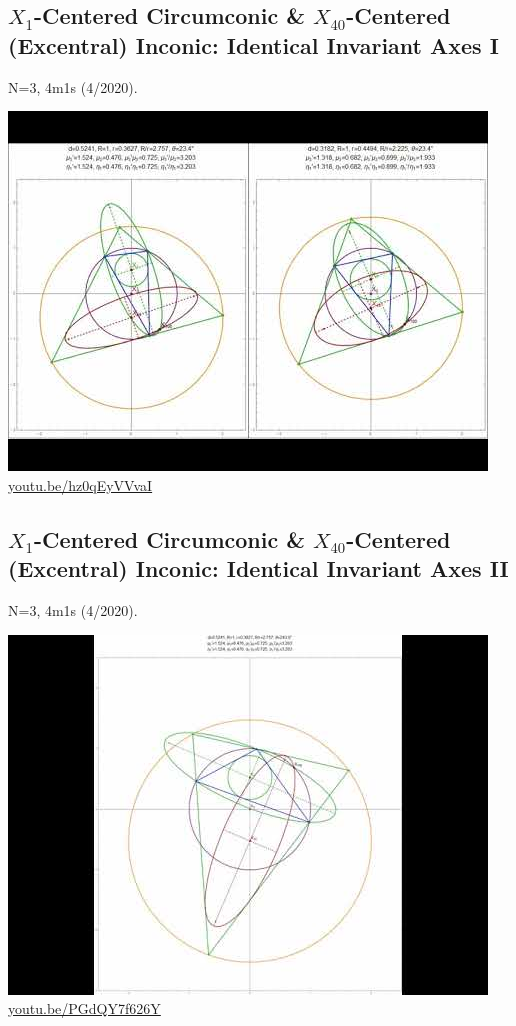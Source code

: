 \documentclass[12pt]{amsart}
\begin{document}
\subsection{$X_{1}$-Centered Circumconic \& $X_{40}$-Centered (Excentral) Inconic: Identical Invariant Axes I}
\label{vid:hz0qEyVVvaI}
\noindent N=3, 4m1s (4/2020). 
\begin{center}\includegraphics[width=.5\textwidth]{pics/hz0qEyVVvaI.jpg} \\ 
\href{https://youtu.be/hz0qEyVVvaI}{\url{youtu.be/hz0qEyVVvaI}}\end{center}
% 

\subsection{$X_{1}$-Centered Circumconic \& $X_{40}$-Centered (Excentral) Inconic: Identical Invariant Axes II}
\label{vid:PGdQY7f626Y}
\noindent N=3, 4m1s (4/2020). 
\begin{center}\includegraphics[width=.5\textwidth]{pics/PGdQY7f626Y.jpg} \\ 
\href{https://youtu.be/PGdQY7f626Y}{\url{youtu.be/PGdQY7f626Y}}\end{center}
% 
\end{document}
